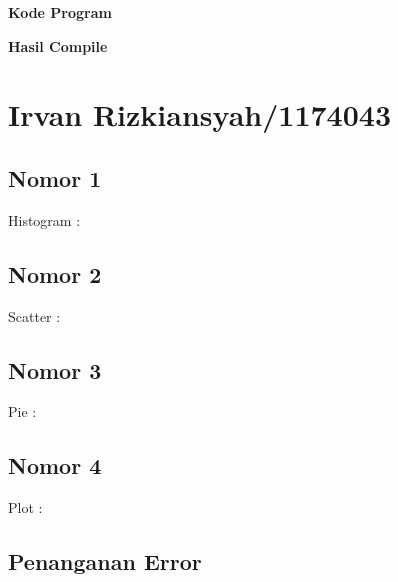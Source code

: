 \hfill \break
\textbf{Kode Program}



\hfill \break
\textbf{Hasil Compile}

\section{Irvan Rizkiansyah/1174043}
	\subsection{Nomor 1}
	Histogram :
		
	\subsection{Nomor 2}
	Scatter :
		
	\subsection{Nomor 3}
	Pie :
		
	\subsection{Nomor 4}
	Plot :
		
	\subsection{Penanganan Error}
		
	